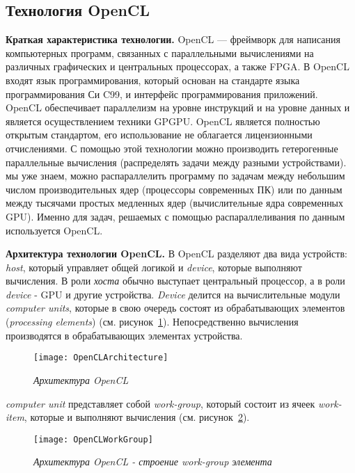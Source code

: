 { %
	\subsection{Технология OpenCL}
	\Large\par\textbf{Краткая характеристика технологии.} OpenCL — фреймворк для написания компьютерных программ, связанных с параллельными вычислениями на различных графических и центральных процессорах, а также FPGA. В OpenCL входят язык программирования, который основан на стандарте языка программирования Си C99, и интерфейс программирования приложений. OpenCL обеспечивает параллелизм на уровне инструкций и на уровне данных и является осуществлением техники GPGPU. OpenCL является полностью открытым стандартом, его использование не облагается лицензионными отчислениями. С помощью этой технологии можно производить гетерогенные параллельные вычисления (распределять задачи между разными устройствами).
	 мы уже знаем, можно распараллелить программу по задачам между небольшим числом производительных ядер (процессоры современных ПК) или по данным между тысячами простых медленных ядер (вычислительные ядра современных GPU). Именно для задач, решаемых с помощью распараллеливания по данным используется OpenCL.
	\par\textbf{Архитектура технологии OpenCL.} В OpenCL разделяют два вида устройств: \textit{host}, который управляет общей логикой и \textit{device}, которые выполняют вычисления. В роли \textit{хоста} обычно выступает центральный процессор, а в роли \textit{device} - GPU и другие устройства. \textit{Device} делится на вычислительные модули \textit{computer units}, которые в свою очередь состоят из обрабатывающих элементов (\textit{processing elements}) (см. рисунок~\ref{OpenCLArchitecture:image}). Непосредственно вычисления  производятся  в  обрабатывающих  элементах устройства.
	\begin{figure}[H]
		\texttt{[image: OpenCLArchitecture]}
		\caption{\textit{Архитектура OpenCL}}
		\label{OpenCLArchitecture:image}
	\end{figure}
	 \textit{computer unit} представляет собой \textit{work-group}, который состоит из ячеек \textit{work-item}, которые и выполняют вычисления (см. рисунок~\ref{OpenCLWorkGroup:image}).
	\begin{figure}[H]
		\texttt{[image: OpenCLWorkGroup]}
		\caption{\textit{Архитектура OpenCL - строение work-group элемента}}
		\label{OpenCLWorkGroup:image}
	\end{figure}
}
